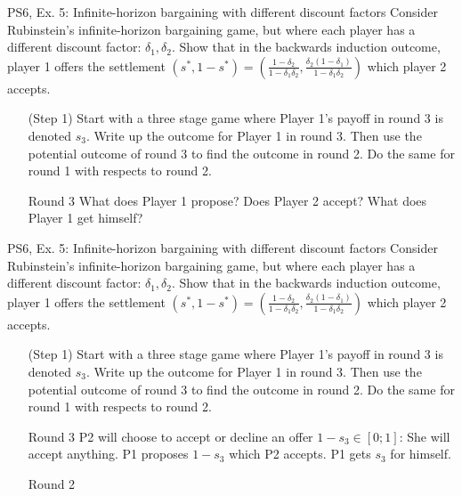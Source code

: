 \begin{frame}{PS6, Ex. 5: Infinite-horizon bargaining with different discount factors}
    Consider Rubinstein's infinite-horizon bargaining game, but where each player has a different discount factor: $\delta_1,\delta_2$. Show that in the backwards induction outcome, player 1 offers the settlement
    $(s^{*},1-s^{*})=\left( \frac{1-\delta_2}{1-\delta_1\delta_2},\frac{\delta_2(1-\delta_1)}{1-\delta_1\delta_2}\right)$
    which player 2 accepts.
    \begin{itemize}
      \item[(Step 1)] Start with a three stage game where Player 1's payoff in round 3 is denoted $s_3$. Write up the outcome for Player 1 in round 3. Then use the potential outcome of round 3 to find the outcome in round 2. Do the same for round 1 with respects to round 2.
    \end{itemize}
    \vfill\null
    \begin{itemize}
        \item[Round 3] What does Player 1 propose? Does Player 2 accept? What does Player 1 get himself?
    \end{itemize}
    \vfill\null
\end{frame}
\begin{frame}{PS6, Ex. 5: Infinite-horizon bargaining with different discount factors}
    Consider Rubinstein's infinite-horizon bargaining game, but where each player has a different discount factor: $\delta_1,\delta_2$. Show that in the backwards induction outcome, player 1 offers the settlement
    $(s^{*},1-s^{*})=\left( \frac{1-\delta_2}{1-\delta_1\delta_2},\frac{\delta_2(1-\delta_1)}{1-\delta_1\delta_2}\right)$
    which player 2 accepts.
    \begin{itemize}
      \item[(Step 1)] Start with a three stage game where Player 1's payoff in round 3 is denoted $s_3$. Write up the outcome for Player 1 in round 3. Then use the potential outcome of round 3 to find the outcome in round 2. Do the same for round 1 with respects to round 2.
    \end{itemize}
    \vfill\null
    \begin{itemize}
        \item[Round 3] P2 will choose to accept or decline an offer $1-s_3\in [0;1]$: She will accept anything. P1 proposes $1-s_3$ which P2 accepts. P1 gets $s_3$ for himself.
        \item[Round 2]
    \end{itemize}
    \vfill\null
\end{frame}
